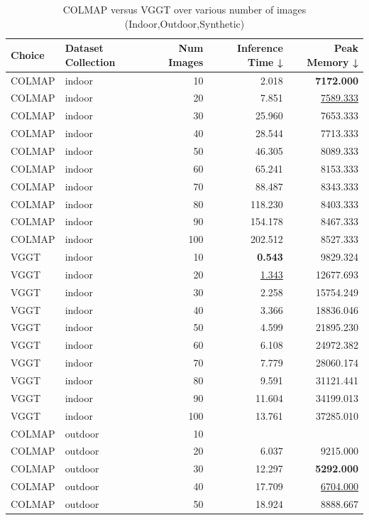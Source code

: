 \begin{table}[H]
\caption{\ifdefined\customcaption \customcaption \else COLMAP versus VGGT over various number of images (Indoor,Outdoor,Synthetic) \fi}
\label{tab:01_num_images_timing_indoor,outdoor,synthetic}
\centering
\scriptsize
\begin{tabular}{llrrr}
\toprule
Choice & Dataset Collection & Num Images & Inference Time ↓ & Peak Memory ↓ \\
\midrule
COLMAP & indoor & 10 & 2.018 & \textbf{7172.000} \\
COLMAP & indoor & 20 & 7.851 & \underline{7589.333} \\
COLMAP & indoor & 30 & 25.960 & 7653.333 \\
COLMAP & indoor & 40 & 28.544 & 7713.333 \\
COLMAP & indoor & 50 & 46.305 & 8089.333 \\
COLMAP & indoor & 60 & 65.241 & 8153.333 \\
COLMAP & indoor & 70 & 88.487 & 8343.333 \\
COLMAP & indoor & 80 & 118.230 & 8403.333 \\
COLMAP & indoor & 90 & 154.178 & 8467.333 \\
COLMAP & indoor & 100 & 202.512 & 8527.333 \\
VGGT & indoor & 10 & \textbf{0.543} & 9829.324 \\
VGGT & indoor & 20 & \underline{1.343} & 12677.693 \\
VGGT & indoor & 30 & 2.258 & 15754.249 \\
VGGT & indoor & 40 & 3.366 & 18836.046 \\
VGGT & indoor & 50 & 4.599 & 21895.230 \\
VGGT & indoor & 60 & 6.108 & 24972.382 \\
VGGT & indoor & 70 & 7.779 & 28060.174 \\
VGGT & indoor & 80 & 9.591 & 31121.441 \\
VGGT & indoor & 90 & 11.604 & 34199.013 \\
VGGT & indoor & 100 & 13.761 & 37285.010 \\
\midrule
COLMAP & outdoor & 10 &  &  \\
COLMAP & outdoor & 20 & 6.037 & 9215.000 \\
COLMAP & outdoor & 30 & 12.297 & \textbf{5292.000} \\
COLMAP & outdoor & 40 & 17.709 & \underline{6704.000} \\
COLMAP & outdoor & 50 & 18.924 & 8888.667 \\

\end{tabular}
\end{table}
